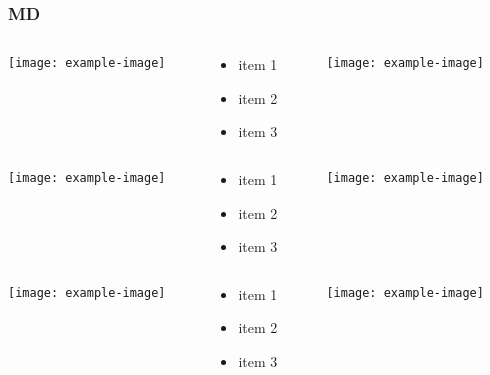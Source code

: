 \documentclass{beamer}
\begin{document}
\begin{frame}
\frametitle{MD}

\begin{columns}
    \begin{column}{.3\textwidth}
        \texttt{[image: example-image]} 
    \end{column}
    \begin{column}{.3\textwidth}
        \begin{itemize}
            \item item 1
            \item item 2
            \item item 3
        \end{itemize}
    \end{column}
    \begin{column}{.3\textwidth}
        \texttt{[image: example-image]} 
    \end{column}
\end{columns}
\vfill
\begin{columns}
    \begin{column}{.3\textwidth}
        \texttt{[image: example-image]} 
    \end{column}
    \begin{column}{.3\textwidth}
        \begin{itemize}
            \item item 1
            \item item 2
            \item item 3
        \end{itemize}
    \end{column}
    \begin{column}{.3\textwidth}
        \texttt{[image: example-image]} 
    \end{column}
\end{columns}
\vfill
\begin{columns}
    \begin{column}{.3\textwidth}
        \texttt{[image: example-image]} 
    \end{column}
    \begin{column}{.3\textwidth}
        \begin{itemize}
            \item item 1
            \item item 2
            \item item 3
        \end{itemize}
    \end{column}
    \begin{column}{.3\textwidth}
        \texttt{[image: example-image]} 
    \end{column}
\end{columns}

\end{frame}
\end{document}
